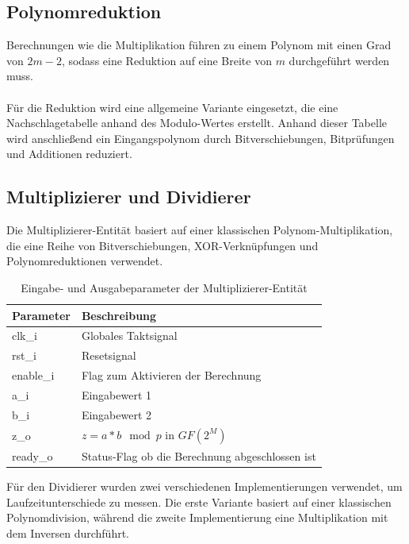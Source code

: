 \subsection{Polynomreduktion}
Berechnungen wie die Multiplikation führen zu einem Polynom mit einen Grad von $2m-2$, sodass eine Reduktion auf eine Breite von $m$ durchgeführt werden muss.
\\ \\
Für die Reduktion wird eine allgemeine Variante eingesetzt, die eine Nachschlagetabelle anhand des Modulo-Wertes erstellt. Anhand dieser Tabelle wird anschließend ein Eingangspolynom durch Bitverschiebungen, Bitprüfungen und Additionen reduziert.

\subsection{Multiplizierer und Dividierer}
Die Multiplizierer-Entität basiert auf einer klassischen Polynom-Multiplikation, die eine Reihe von Bitverschiebungen, XOR-Verknüpfungen und Polynomreduktionen verwendet. \\

\begin{table} [h]
	\centering 
	\begin{tabular}{ | p{3cm} | p{12cm} | }
		\hline
		\textbf{Parameter} & \textbf{Beschreibung}\\
		\hline
		clk\_i & Globales Taktsignal \\
		\hline
		rst\_i & Resetsignal \\
		\hline
		enable\_i & Flag zum Aktivieren der Berechnung \\
		\hline
		a\_i & Eingabewert 1 \\
		\hline
		b\_i & Eingabewert 2 \\
		\hline
		z\_o & $z = a*b \mod p$ in $GF(2^M)$ \\
		\hline
		ready\_o & Status-Flag ob die Berechnung abgeschlossen ist  \\
		\hline
		\hline
	\end{tabular}
	\caption{Eingabe- und Ausgabeparameter der Multiplizierer-Entität}
	\label{tab:vhdl-impl-mult-param}
\end{table}

Für den Dividierer wurden zwei verschiedenen Implementierungen verwendet, um Laufzeitunterschiede zu messen. Die erste Variante basiert auf einer klassischen Polynomdivision, während die zweite Implementierung eine Multiplikation mit dem Inversen durchführt. \\

